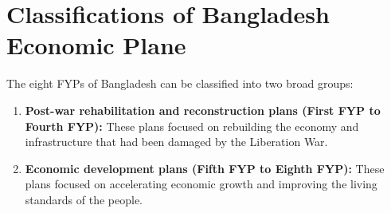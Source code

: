 \section{Classifications of Bangladesh Economic Plane}
The eight FYPs of Bangladesh can be classified into two broad groups:

\begin{enumerate}
	\item \textbf{Post-war rehabilitation and reconstruction plans (First FYP to Fourth FYP):} 
	These plans focused on rebuilding the economy and infrastructure that had been damaged by the Liberation War.
	\item \textbf{Economic development plans (Fifth FYP to Eighth FYP):} These plans focused on 
	accelerating economic growth and improving the living standards of the people.
\end{enumerate}

